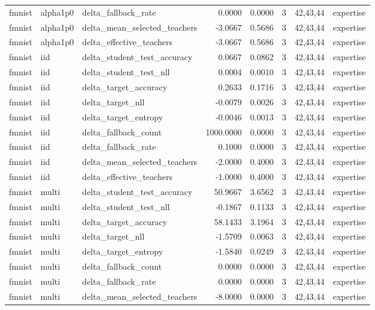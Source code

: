 \begin{tabular}{lllrrrll}
fmnist & alpha1p0 & delta\_fallback\_rate & 0.0000 & 0.0000 & 3 & 42,43,44 & expertise \\
fmnist & alpha1p0 & delta\_mean\_selected\_teachers & -3.0667 & 0.5686 & 3 & 42,43,44 & expertise \\
fmnist & alpha1p0 & delta\_effective\_teachers & -3.0667 & 0.5686 & 3 & 42,43,44 & expertise \\
fmnist & iid & delta\_student\_test\_accuracy & 0.0667 & 0.0862 & 3 & 42,43,44 & expertise \\
fmnist & iid & delta\_student\_test\_nll & 0.0004 & 0.0010 & 3 & 42,43,44 & expertise \\
fmnist & iid & delta\_target\_accuracy & 0.2633 & 0.1716 & 3 & 42,43,44 & expertise \\
fmnist & iid & delta\_target\_nll & -0.0079 & 0.0026 & 3 & 42,43,44 & expertise \\
fmnist & iid & delta\_target\_entropy & -0.0046 & 0.0013 & 3 & 42,43,44 & expertise \\
fmnist & iid & delta\_fallback\_count & 1000.0000 & 0.0000 & 3 & 42,43,44 & expertise \\
fmnist & iid & delta\_fallback\_rate & 0.1000 & 0.0000 & 3 & 42,43,44 & expertise \\
fmnist & iid & delta\_mean\_selected\_teachers & -2.0000 & 0.4000 & 3 & 42,43,44 & expertise \\
fmnist & iid & delta\_effective\_teachers & -1.0000 & 0.4000 & 3 & 42,43,44 & expertise \\
fmnist & multi & delta\_student\_test\_accuracy & 50.9667 & 3.6562 & 3 & 42,43,44 & expertise \\
fmnist & multi & delta\_student\_test\_nll & -0.1867 & 0.1133 & 3 & 42,43,44 & expertise \\
fmnist & multi & delta\_target\_accuracy & 58.1433 & 3.1964 & 3 & 42,43,44 & expertise \\
fmnist & multi & delta\_target\_nll & -1.5709 & 0.0063 & 3 & 42,43,44 & expertise \\
fmnist & multi & delta\_target\_entropy & -1.5840 & 0.0249 & 3 & 42,43,44 & expertise \\
fmnist & multi & delta\_fallback\_count & 0.0000 & 0.0000 & 3 & 42,43,44 & expertise \\
fmnist & multi & delta\_fallback\_rate & 0.0000 & 0.0000 & 3 & 42,43,44 & expertise \\
fmnist & multi & delta\_mean\_selected\_teachers & -8.0000 & 0.0000 & 3 & 42,43,44 & expertise \\

\end{tabular}
